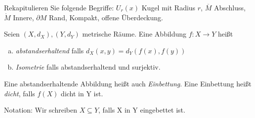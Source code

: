\documentclass[ngerman]{report}
\begin{document}
	\begin{bem}\label{bem:1.30} Rekapitulieren Sie folgende Begriffe:
		$U_r(x)$ Kugel mit Radius $r$,	$\overline{M}$ Abschluss,	$\mathring{M}$ Innere,	$\partial M$ Rand,	Kompakt,	offene Überdeckung. 
	\end{bem}
	
\begin{definition} %
	Seien $(X,d_X),(Y,d_Y)$ metrische Räume. Eine Abbildung $f:X\to Y$ heißt
	\begin{enumerate}[(a)]
		\item \textit{abstandserhaltend} falls $d_X(x,y)=d_Y(f(x),f(y))$ %
		\item \textit{Isometrie} falls abstandserhaltend und surjektiv.
	\end{enumerate}
	Eine abstandserhaltende  Abbildung heißt auch \textit{Einbettung}. Eine Einbettung heißt \textit{dicht}, falls $f(X)$ dicht in Y ist.\par
	Notation: Wir schreiben $X\subseteq Y$, falls X in Y eingebettet ist.
\end{definition}
\end{document}

